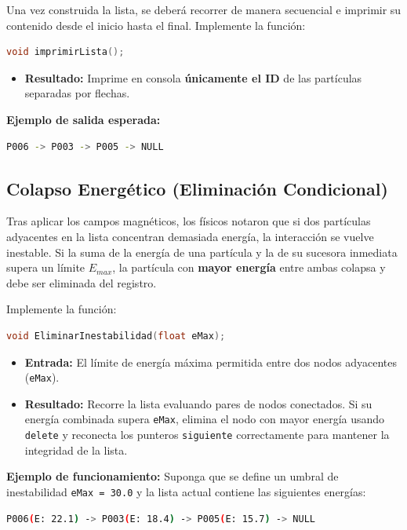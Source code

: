 \documentclass[11pt, letterpaper]{article}
\begin{document}
Una vez construida la lista, se deberá recorrer de manera secuencial e imprimir su contenido desde el inicio hasta el final. Implemente la función:
\begin{lstlisting}[language=C++]
void imprimirLista();
\end{lstlisting}
\begin{itemize}[noitemsep, topsep=0pt]
    \item \textbf{Resultado:} Imprime en consola \textbf{únicamente el ID} de las partículas separadas por flechas.
\end{itemize}
\textbf{Ejemplo de salida esperada:}
\begin{lstlisting}[language=bash]
P006 -> P003 -> P005 -> NULL
\end{lstlisting}

\subsection{Colapso Energético (Eliminación Condicional)}
Tras aplicar los campos magnéticos, los físicos notaron que si dos partículas adyacentes en la lista concentran demasiada energía, la interacción se vuelve inestable. Si la suma de la energía de una partícula y la de su sucesora inmediata supera un límite $E_{max}$, la partícula con \textbf{mayor energía} entre ambas colapsa y debe ser eliminada del registro.

Implemente la función:
\begin{lstlisting}[language=C++]
void EliminarInestabilidad(float eMax);
\end{lstlisting}
\begin{itemize}[noitemsep, topsep=0pt]
    \item \textbf{Entrada:} El límite de energía máxima permitida entre dos nodos adyacentes (\texttt{eMax}).
    \item \textbf{Resultado:} Recorre la lista evaluando pares de nodos conectados. Si su energía combinada supera \texttt{eMax}, elimina el nodo con mayor energía usando \texttt{delete} y reconecta los punteros \texttt{siguiente} correctamente para mantener la integridad de la lista.
\end{itemize}

\textbf{Ejemplo de funcionamiento:}
Suponga que se define un umbral de inestabilidad \texttt{eMax = 30.0} y la lista actual contiene las siguientes energías:
\begin{lstlisting}[language=bash]
P006(E: 22.1) -> P003(E: 18.4) -> P005(E: 15.7) -> NULL
\end{lstlisting}
\end{document}
